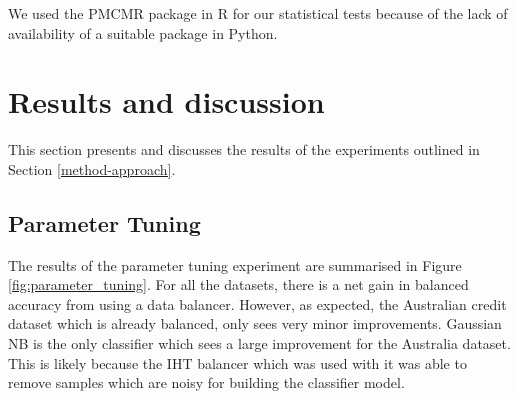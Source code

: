 \documentclass{sig-alternate-05-2015}
\begin{document}
	We used the PMCMR \cite{pmcmr} package in R for our statistical tests because of the lack of availability of a suitable package in Python.
	
	\section{Results and discussion}
	\label{results}
	This section presents and discusses the results of the experiments outlined in Section \ref{method-approach}.
	\subsection{Parameter Tuning}
	The results of the parameter tuning experiment are summarised in Figure \ref{fig:parameter_tuning}. For all the datasets, there is a net gain in balanced accuracy from using a data balancer. However, as expected, the Australian credit dataset which is already balanced, only sees very minor improvements. Gaussian NB is the only classifier which sees a large improvement for the Australia dataset. This is likely because the IHT balancer which was used with it was able to remove samples which are noisy for building the classifier model. 
	
\end{document}
